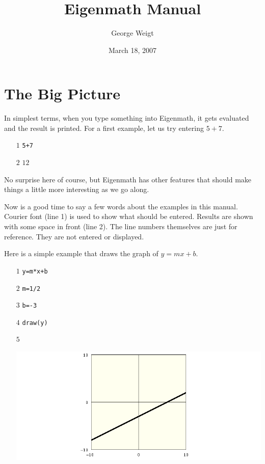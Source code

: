 \documentclass[12pt,openany]{report}
\title{Eigenmath Manual}
\author{George Weigt}
\date{March 18, 2007}
\begin{document}
\maketitle

\newpage

\section*{The Big Picture}
In simplest terms, when you type something into Eigenmath,
it gets evaluated and the result is printed.
For a first example, let us try entering $5+7$.

\medskip
\noindent
\begin{itemize}
\item[$\scriptstyle1$]{\tt 5+7}
\item[$\scriptstyle2$]\hspace{50pt} $12$
\end{itemize}

\medskip
\noindent
No surprise here of course, but Eigenmath has other features
that should make things a little more interesting as we go along.

\medskip
\noindent
Now is a good time to say a few words about the examples in this manual.
Courier font (line 1) is used to show what should be entered.
Results are shown with some space in front (line 2).
The line numbers themselves are just for reference.
They are not entered or displayed.

\newpage

\noindent
Here is a simple example that draws the graph of $y=mx+b$.

\medskip
\noindent
\begin{itemize}
\item[$\scriptstyle1$]{\tt y=m*x+b}
\item[$\scriptstyle2$]{\tt m=1/2}
\item[$\scriptstyle3$]{\tt b=-3}
\item[$\scriptstyle4$]{\tt draw(y)}
\item[$\scriptstyle5$]
\item[]\includegraphics[scale=0.5]{1.png}
\end{itemize}
\end{document}
